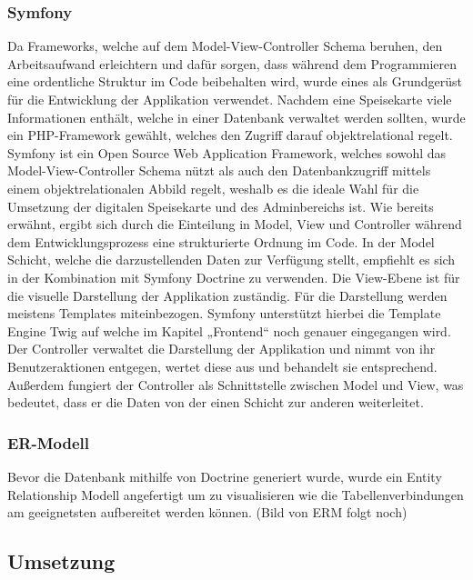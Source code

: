     \subsubsection{Symfony}

Da Frameworks, welche auf dem Model-View-Controller Schema beruhen, den Arbeitsaufwand erleichtern und dafür sorgen, dass während dem Programmieren eine ordentliche Struktur im Code beibehalten wird, wurde eines als Grundgerüst für die Entwicklung der Applikation verwendet. Nachdem eine Speisekarte viele Informationen enthält, welche in einer Datenbank verwaltet werden sollten, wurde ein PHP-Framework gewählt, welches den Zugriff darauf objektrelational regelt.
Symfony ist ein Open Source Web Application Framework, welches sowohl das Model-View-Controller Schema nützt als auch den Datenbankzugriff mittels einem objektrelationalen Abbild regelt, weshalb es die ideale Wahl für die Umsetzung der digitalen Speisekarte und des Adminbereichs ist. Wie bereits erwähnt, ergibt sich durch die Einteilung in Model, View und Controller während dem Entwicklungsprozess eine strukturierte Ordnung im Code. In der Model Schicht, welche die darzustellenden Daten zur Verfügung stellt, empfiehlt es sich in der Kombination mit Symfony Doctrine zu verwenden. Die View-Ebene ist für die visuelle Darstellung der Applikation zuständig. Für die  Darstellung werden meistens Templates miteinbezogen. Symfony unterstützt hierbei die Template Engine Twig auf welche im Kapitel „Frontend“ noch genauer eingegangen wird.
Der Controller verwaltet die Darstellung der Applikation und nimmt von ihr Benutzeraktionen entgegen, wertet diese aus und behandelt sie entsprechend. Außerdem fungiert der Controller als Schnittstelle zwischen Model und View, was bedeutet, dass er die Daten von der einen Schicht zur anderen weiterleitet.
    

    \subsubsection{ER-Modell}

Bevor die Datenbank mithilfe von Doctrine generiert wurde, wurde ein Entity Relationship Modell angefertigt um zu visualisieren wie die Tabellenverbindungen am geeignetsten aufbereitet werden können.  
(Bild von ERM folgt noch) 
 
  \subsection{Umsetzung}


